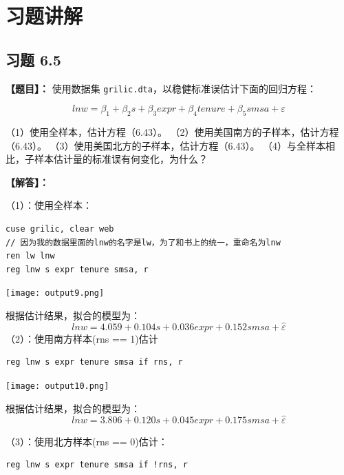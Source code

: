 \documentclass[cn,fancy,blue,11pt]{elegantbook}
\begin{document}
\hypertarget{section-43}{%
\chapter{习题讲解}\label{section-43}}

\hypertarget{section-44}{%
\section{习题 6.5}\label{section-44}}

\textbf{【题目】：}
使用数据集 \lstinline{grilic.dta}，以稳健标准误估计下面的回归方程：

\begin{equation}
  ln w = \beta_{1} + \beta_{2} s + \beta_{3} expr + \beta_{4} tenure + \beta_{5} smsa + \varepsilon
\end{equation}

（1）使用全样本，估计方程（6.43）。
（2）使用美国南方的子样本，估计方程（6.43）。
（3）使用美国北方的子样本，估计方程（6.43）。
（4）与全样本相比，子样本估计量的标准误有何变化，为什么？

\textbf{【解答】：}

（1）：使用全样本：

\begin{lstlisting}
cuse grilic, clear web
// 因为我的数据里面的lnw的名字是lw，为了和书上的统一，重命名为lnw
ren lw lnw
reg lnw s expr tenure smsa, r
\end{lstlisting}

\noindent\texttt{[image: output9.png]}

根据估计结果，拟合的模型为：
\begin{equation}
  lnw = 4.059 + 0.104s + 0.036expr + 0.152smsa +\hat{\varepsilon}
\end{equation}
（2）：使用南方样本(rns == 1)估计

\begin{lstlisting}
reg lnw s expr tenure smsa if rns, r
\end{lstlisting}

\noindent\texttt{[image: output10.png]}

根据估计结果，拟合的模型为：
\begin{equation}
  lnw = 3.806 + 0.120s + 0.045expr + 0.175smsa +\hat{\varepsilon}
\end{equation}

（3）：使用北方样本(rns == 0)估计：

\begin{lstlisting}
reg lnw s expr tenure smsa if !rns, r
\end{lstlisting}
\end{document}
